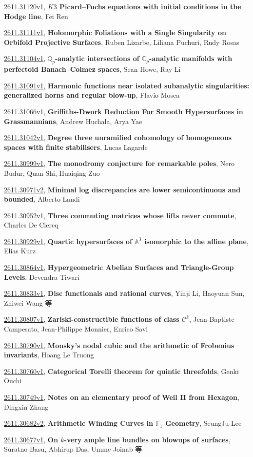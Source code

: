 \documentclass[9pt, a4paper]{article}
\theoremstyle{plain}
\theoremstyle{definition}
\theoremstyle{remark}
\newcommand{\arxiv}[3]{\href{https://arxiv.org/abs/#1}{#1}, \textbf{\textcolor{arxivblue}{#2}}, #3}
\begin{document}
\arxiv{2611.31120v1}{$K3$ Picard--Fuchs equations with initial conditions in the Hodge line}{Fei Ren}

\arxiv{2611.31111v1}{Holomorphic Foliations with a Single Singularity on Orbifold Projective Surfaces}{Ruben Lizarbe, Liliana Puchuri, Rudy Rosas}

\arxiv{2611.31104v1}{$\mathbb{Q}_p$-analytic intersections of $\mathbb{C}_p$-analytic manifolds with perfectoid Banach--Colmez spaces}{Sean Howe, Ray Li}

\arxiv{2611.31091v1}{Harmonic functions near isolated subanalytic singularities: generalized horns and regular blow-up}{Flavio Mosca}

\arxiv{2611.31066v1}{Griffiths-Dwork Reduction For Smooth Hypersurfaces in Grassmannians}{Andrew Huchala, Arya Yae}

\arxiv{2611.31042v1}{Degree three unramified cohomology of homogeneous spaces with finite stabilisers}{Lucas Lagarde}

\arxiv{2611.30999v1}{The monodromy conjecture for remarkable poles}{Nero Budur, Quan Shi, Huaiqing Zuo}

\arxiv{2611.30971v2}{Minimal log discrepancies are lower semicontinuous and bounded}{Alberto Landi}

\arxiv{2611.30952v1}{Three commuting matrices whose lifts never commute}{Charles De Clercq}

\arxiv{2611.30929v1}{Quartic hypersurfaces of $\mathbb{A}^3$ isomorphic to the affine plane}{Elias Kurz}

\arxiv{2611.30864v1}{Hypergeometric Abelian Surfaces and Triangle-Group Levels}{Devendra Tiwari}

\arxiv{2611.30833v1}{Disc functionals and rational curves}{Yinji Li, Haoyuan Sun, Zhiwei Wang 等}

\arxiv{2611.30807v1}{Zariski-constructible functions of class $\mathcal{C}^k$}{Jean-Baptiste Campesato, Jean-Philippe Monnier, Enrico Savi}

\arxiv{2611.30790v1}{Monsky's nodal cubic and the arithmetic of Frobenius invariants}{Hoang Le Truong}

\arxiv{2611.30760v1}{Categorical Torelli theorem for quintic threefolds}{Genki Ouchi}

\arxiv{2611.30749v1}{Notes on an elementary proof of Weil II from Hexagon}{Dingxin Zhang}

\arxiv{2611.30682v2}{Arithmetic Winding Curves in $\mathbb{F}_1$ Geometry}{SeungJu Lee}

\arxiv{2611.30677v1}{On $k$-very ample line bundles on blowups of surfaces}{Suratno Basu, Abhirup Das, Umme Joinab 等}
\end{document}
